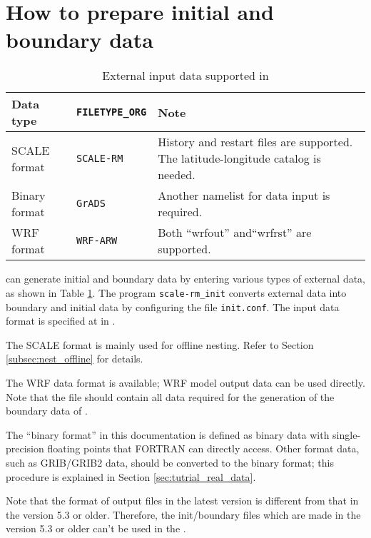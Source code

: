 \section{How to prepare initial and boundary data} \label{sec:adv_datainput}

\begin{table}[tbh]
\begin{center}
\caption{External input data supported in \scalelib}
\begin{tabularx}{150mm}{l|l|X} \hline
 \rowcolor[gray]{0.9} Data type   & \verb|FILETYPE_ORG|  & Note \\ \hline
 SCALE format   & \verb|SCALE-RM|     & History and restart files are supported. The latitude-longitude catalog is needed. \\ \hline
 Binary format  & \verb|GrADS|        & Another namelist for data input is required.    \\ \hline
 WRF format     & \verb|WRF-ARW|      & Both ``wrfout''  and``wrfrst'' are supported.\\ \hline
\end{tabularx}
\label{tab:inputdata_format}
\end{center}
\end{table}

\scalerm can generate initial and boundary data by entering various types of external data, as shown in Table \ref{tab:inputdata_format}.
The program \verb|scale-rm_init| converts external data into boundary and initial data by configuring the file \verb|init.conf|.
The input data format is specified at  in .

The SCALE format is mainly used for offline nesting.
Refer to Section \ref{subsec:nest_offline} for details.

The WRF data format is available; WRF model output data can be used directly.
Note that the file should contain all data required for the generation of the boundary data of \scalerm.

The ``binary format'' in this documentation is defined as binary data with single-precision floating points that FORTRAN can directly access.
Other format data, such as GRIB/GRIB2 data, should be converted to the binary format; this procedure is explained in Section \ref{sec:tutrial_real_data}.

Note that the format of output files in the latest version is different from that in the version 5.3 or older.
Therefore, the init/boundary files which are made in the version 5.3 or older can't be used in the \scalelib \version.

